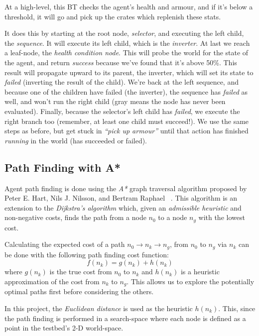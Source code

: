\documentclass[a4paper, twocolumn]{article}
\begin{document}
        At a high-level, this BT checks the agent's health and armour, and if it's below a threshold, it will go and pick up the crates which replenish these stats.

        It does this by starting at the root node, \emph{selector}, and executing the left child, the \emph{sequence}. It will execute its left child, which is the \emph{inverter}. At last we reach a leaf-node, the \emph{health condition node}. This will probe the world for the state of the agent, and return \emph{success} because we've found that it's above 50\%. This result will propagate upward to its parent, the inverter, which will set its state to \emph{failed} (inverting the result of the child). We're back at the left sequence, and because one of the children have failed (the inverter), the sequence has \emph{failed} as well, and won't run the right child (gray means the node has never been evaluated). Finally, because the selector's left child has \emph{failed}, we execute the right branch too (remember, at least one child must succeed!). We use the same steps as before, but get stuck in \emph{``pick up armour''} until that action has finished \emph{running} in the world (has succeeded or failed).

        \subsection{Path Finding with A*} \label{sec:path_finding}

	Agent path finding is done using the \emph{A*} graph traversal algorithm proposed by Peter E. Hart, Nils J. Nilsson, and Bertram Raphael ~\cite{hart1968formal}. This algorithm is an extension to the \emph{Dijkstra's algorithm} which, given an \emph{admissible heuristic} and non-negative costs, finds the path from a node \(n_0\) to a node \(n_g\) with the lowest cost.
	
    Calculating the expected cost of a path \(n_0 \rightarrow n_k \rightarrow n_g\), from \(n_0\) to \(n_g\) via \(n_k\) can be done with the following path finding cost function:
	\begin{equation*}
		f(n_k) = g(n_k) + h(n_k)
	\end{equation*}	
	where \(g(n_k)\) is the true cost from \(n_0\) to \(n_k\) and \(h(n_k)\) is a heuristic approximation of the cost from \(n_k\) to \(n_g\). This allows us to explore the potentially optimal paths first before considering the others.

        In this project, the \emph{Euclidean distance} is used as the heuristic \(h(n_k)\). This, since the path finding is performed in a search-space where each node is defined as a point in the testbed's 2-D world-space.
\end{document}
